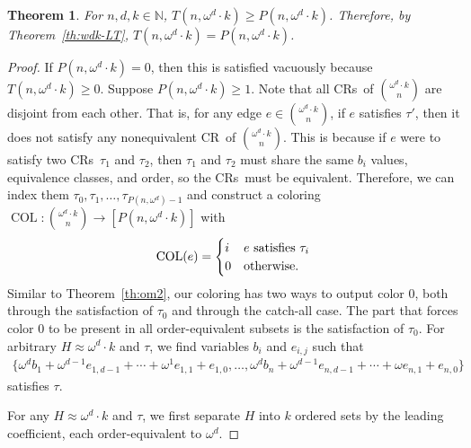 \documentclass[10pt,a4paper]{article}
\newcommand{\om}{\omega}
\newcommand{\oequiv}{\approx}
\newcommand{\COL}{\operatorname{COL}}
\newcommand{\N}{\mathbb{N}}
\newcommand{\crulenospace}{CR}
\newcommand{\crule}{\crulenospace~}
\newcommand{\crules}{\crulenospace s~}
\newcommand{\numpoints}{n}
\newcommand{\inumpoints}{i}
\newcommand{\idegr}{j}
\newcommand{\rareconst}{b}
\theoremstyle{plain}
\newtheorem{theorem}{Theorem}[section]
\theoremstyle{definition}
\begin{document}
\begin{theorem}\label{th:wdk-GT}
For $\numpoints,d,k \in \N$, $T\left(\numpoints,\om^d \cdot k\right) \geq P\left(\numpoints,\om^d \cdot k\right)$.
Therefore, by Theorem~\ref{th:wdk-LT}, \linebreak $T(\numpoints,\om^d \cdot k) = P(\numpoints,\om^d \cdot k)$.
\end{theorem}
\begin{proof}
If $P(\numpoints,\om^d \cdot k) = 0$, then this is satisfied vacuously because $T(\numpoints, \om^d \cdot k) \geq 0$. Suppose $P(\numpoints,\om^d \cdot k) \geq 1$. Note that all \crules of $\binom{\om^d \cdot k}{\numpoints}$ are disjoint from each other. That is, for any edge $e \in \binom{\om^d \cdot k}{\numpoints}$, if $e$ satisfies $\tau'$, then it does not satisfy any nonequivalent \crule of $\binom{\om^d \cdot k}{\numpoints}$. This is because if $e$ were to satisfy two \crules $\tau_1$ and $\tau_2$, then $\tau_1$ and $\tau_2$ must share the same $\rareconst_{\inumpoints}$ values, equivalence classes, and order, so the \crules must be equivalent. Therefore, we can index them $\tau_0, \tau_1, \ldots, \tau_{P(\numpoints, \om^d)-1}$ and construct a coloring $\COL \colon \binom{\om^d \cdot k}{\numpoints} \to [P(\numpoints, \om^d\cdot k)]$ with \begin{align*}
    \COL(e) = \begin{cases}
    i & e \textnormal{ satisfies } \tau_i\\
    0 & \textnormal{otherwise}.
    \end{cases}
\end{align*}
Similar to Theorem~\ref{th:om2}, our coloring has two ways to output color 0, both 
through the satisfaction of $\tau_0$ and through the catch-all case. The part that forces 
color 0 to be present in all order-equivalent subsets is the satisfaction of $\tau_0$.
For arbitrary $H \oequiv \om^{d}\cdot k$ and $\tau$, we find variables $\rareconst_{\inumpoints}$ and $e_{\inumpoints,\idegr}$ such that
\begin{align*}
    \{\om^d \rareconst_1 + \om^{d-1} e_{1,d-1} + \cdots + \om^{1} e_{1,1} + e_{1,0}, \ldots,
    \om^d \rareconst_{\numpoints} + \om^{d-1} e_{\numpoints,d-1} + \cdots + \om e_{\numpoints,1} + e_{\numpoints,0}\}
\end{align*}
satisfies $\tau$.

For any $H \oequiv \om^{d}\cdot k$ and $\tau$, we first separate $H$ 
into $k$ ordered sets by the leading coefficient, each order-equivalent to $\om^d$.


\end{proof}
\end{document}
